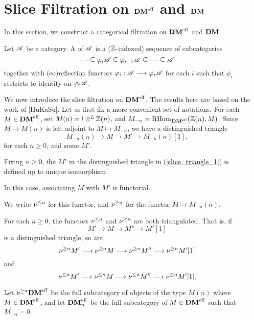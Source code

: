 \newpage
\section{Slice Filtration on $\mathbf{DM}^{\mathrm{eff}}$ and $\mathbf{DM}$}\label{sect_slice_filt_dm}

In this section, we construct a categorical filtration on $\mathbf{DM}^{\mathrm{eff}}$ 
and $\mathbf{DM}$.

\begin{defn}\label{def_cat_filtration}
Let $\mathscr{A}$ be a category. A  of $\mathscr{A}$ 
is a ($\mathbb{Z}$-indexed) sequence of subcategories
\[
\cdots \subseteq \varphi_i\mathscr{A} \subseteq \varphi_{i - 1}\mathscr{A} 
   \subseteq \cdots \subseteq \mathscr{A}
\]
together with (co)reflection functors $\varphi_i: \mathscr{A} \longrightarrow 
\varphi_i\mathscr{A}$ for each $i$ such that $\phi_i$ restricts to 
identity on $\varphi_i\mathscr{A}$.
\end{defn}

We now introduce the slice filtration on $\mathbf{DM}^{\mathrm{eff}}$. The results here
are based on the work of [HuKaSu]. Let us first fix a more 
convenient set of notations. For each $M \in \mathbf{DM}^{\mathrm{eff}}$, set $M(n) = 
l \otimes^L \mathbb{Z}(n)$, and $M_{-n} = \mathrm{RHom}_{\mathbf{DM}^{\mathrm{eff}}}(\mathbb{Z}(n), M)$. Since $M \mapsto
M(n)$ is left adjoint to $M \mapsto M_{-n}$, we have a 
distinguished triangle 
\begin{equation}\label{slice_triangle_1}
M_{-n}(n) \to M \to M' \to M_{-n}(n)[1],
\end{equation}
for each $n \geq 0$, and some $M'$. 

\begin{prop}
Fixing $n \geq 0$, the $M'$ in the distinguished triangle in
(\ref{slice_triangle_1}) is defined up to unique isomorphism.

In this case, associating $M$ with $M'$ is functorial.
\end{prop}

We write $\nu^{\leq n}$ for this functor, and $\nu^{\geq n}$ for the
functor $M \mapsto M_{-n}(n)$.

\begin{prop}
For each $n \geq 0$, the functors $\nu^{\leq n}$ and $\nu^{\geq n}$ are
both triangulated. That is, if
\[
M' \to M \to M'' \to M'[1]
\]
is a distinguished triangle, so are
\[
\nu^{\geq n}M' \longrightarrow \nu^{\geq n}M \longrightarrow \nu^{\geq n}M'' \longrightarrow \nu^{\geq n}M'[1]
\]
and
\[
\nu^{\leq n}M' \longrightarrow \nu^{\leq n}M \longrightarrow \nu^{\leq n}M'' \longrightarrow \nu^{\leq n}M'[1].
\]
\end{prop}

Let $\nu^{\geq n}\mathbf{DM}^{\mathrm{eff}}$ be the full subcategory of objects of the 
type $M(n)$ where $M \in \mathbf{DM}^{\mathrm{eff}}$, and let $\mathbf{DM}^{\mathrm{eff}}_{n}$ be the full 
subcategory of $M \in \mathbf{DM}^{\mathrm{eff}}$ such that $M_{-n} = 0$.


